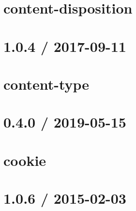 \let\mypdfximage\pdfximage\def\pdfximage{\immediate\mypdfximage}\documentclass[twoside]{book}
\newcommand{\+}{\discretionary{\mbox{\scriptsize$\hookleftarrow$}}{}{}}
\begin{document}
\chapter{content-\/disposition}
\label{md__c_1__git_hub__p_r_o_y_e_c_t_o-_i_i_i-_g_o_t_rest-api_node_modules_content-disposition__r_e_a_d_m_e}

\chapter{1.0.4 / 2017-\/09-\/11}
\label{md__c_1__git_hub__p_r_o_y_e_c_t_o-_i_i_i-_g_o_t_rest-api_node_modules_content-type__h_i_s_t_o_r_y}

\chapter{content-\/type}
\label{md__c_1__git_hub__p_r_o_y_e_c_t_o-_i_i_i-_g_o_t_rest-api_node_modules_content-type__r_e_a_d_m_e}

\chapter{0.4.0 / 2019-\/05-\/15}
\label{md__c_1__git_hub__p_r_o_y_e_c_t_o-_i_i_i-_g_o_t_rest-api_node_modules_cookie__h_i_s_t_o_r_y}

\chapter{cookie}
\label{md__c_1__git_hub__p_r_o_y_e_c_t_o-_i_i_i-_g_o_t_rest-api_node_modules_cookie__r_e_a_d_m_e}

\chapter{1.0.6 / 2015-\/02-\/03}
\label{md__c_1__git_hub__p_r_o_y_e_c_t_o-_i_i_i-_g_o_t_rest-api_node_modules_cookie-signature__history}

\end{document}

